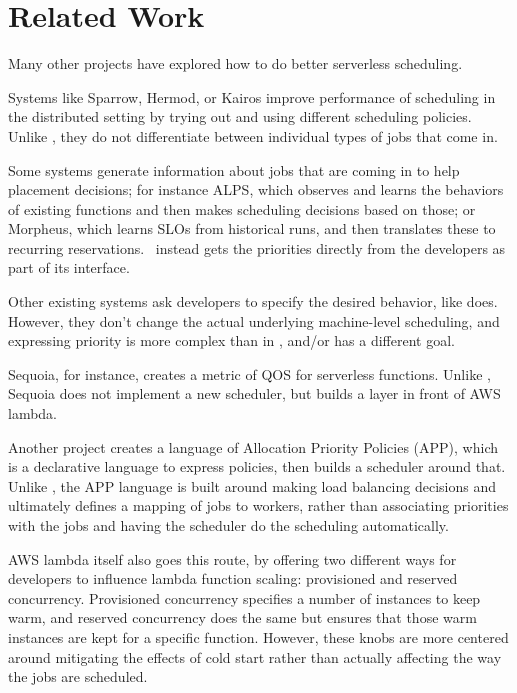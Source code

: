\section{Related Work}

Many other projects have explored how to do better serverless scheduling.
 
Systems like Sparrow\cite{sparrow}, Hermod\cite{hermod}, or Kairos\cite{kairos}
improve performance of scheduling in the distributed setting by trying out and
using different scheduling policies. Unlike \sys{}, they do not differentiate
between individual types of jobs that come in.


Some systems generate information about jobs that are coming in to help
placement decisions; for instance ALPS\cite{alps}, which observes and learns the
behaviors of existing functions and then makes scheduling decisions based on
those; or Morpheus\cite{morpheus}, which learns SLOs from historical runs, and
then translates these to recurring reservations.~\Sys{} instead gets the
priorities directly from the developers as part of its interface.


Other existing systems ask developers to specify the desired behavior, like
\sys{} does. However, they don't change the actual underlying machine-level
scheduling, and expressing priority is more complex than in \sys{}, and/or has a
different goal.

Sequoia\cite{sequoia}, for instance, creates a metric of QOS for serverless
functions. Unlike \sys{}, Sequoia does not implement a new scheduler, but builds
a layer in front of AWS lambda. 

Another project\cite{app-paper} creates a language of Allocation Priority Policies
(APP), which is a declarative language to express policies, then builds a
scheduler around that. Unlike \sys{}, the APP language is built around making
load balancing decisions and ultimately defines a mapping of jobs to workers,
rather than associating priorities with the jobs and having the scheduler do the
scheduling automatically.

AWS lambda itself also goes this route, by offering two different ways for
developers to influence lambda function scaling: provisioned and reserved
concurrency\cite{aws-scaling}. Provisioned concurrency specifies a number of
instances to keep warm, and reserved concurrency does the same but ensures that
those warm instances are kept for a specific function. However, these knobs are
more centered around mitigating the effects of cold start rather than actually
affecting the way the  jobs are scheduled.
